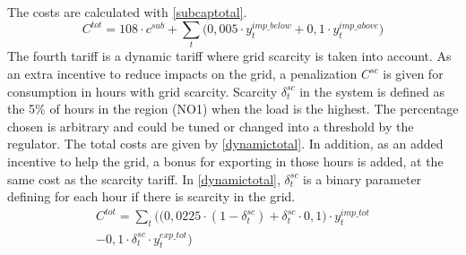 \documentclass[conference]{IEEEtran}
\begin{document}
The costs are calculated with \eqref{subcaptotal}.
\begin{equation}
   C^{tot} = 108 \cdot c^{sub} + \sum_t \big( 0,005\cdot y_{t}^{imp\_below} + 0,1\cdot y_{t}^{imp\_above} \big)
\end{equation}
The fourth tariff is a dynamic tariff where grid scarcity is taken into account. As an extra incentive to reduce impacts on the grid, a penalization $C^{sc}$ is given for consumption in hours with grid scarcity. Scarcity $\delta _{t}^{sc}$ in the system is defined as the 5\% of hours in the region (NO1) when the load is the highest. The percentage chosen is arbitrary and could be tuned or changed into a threshold by the regulator. The total costs are given by \eqref{dynamictotal}. In addition, as an added incentive to help the grid, a bonus for exporting in those hours is added, at the same cost as the scarcity tariff. In \eqref{dynamictotal}, $\delta _{t}^{sc}$ is a binary parameter defining for each hour if there is scarcity in the grid.
\begin{multline}
    C^{tot} = \sum_t \Big( \big( 0,0225\cdot(1-\delta _{t}^{sc}) + \delta _{t}^{sc} \cdot 0,1 \big) \cdot y_{t}^{imp\_tot} \\ - 0,1 \cdot  \delta _{t}^{sc} \cdot y_{t}^{exp\_tot} \Big)
\end{multline}
\end{document}
